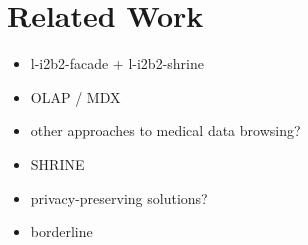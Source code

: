 \section{Related Work}

\begin{itemize}
    \item l-i2b2-facade + l-i2b2-shrine
    \item OLAP / MDX
    \item other approaches to medical data browsing?
    \item SHRINE
    \item privacy-preserving solutions?
    \item borderline
\end{itemize}



